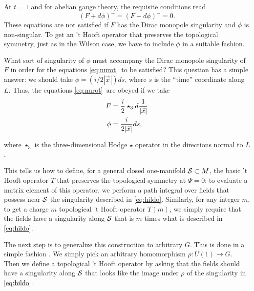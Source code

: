At $t=1$ and for abelian gauge theory, the requisite conditions
read %
\setcounter{equation}{7}
\begin{equation}\label{eq:nurot}
(F+d\phi)^+=(F-d\phi)^-=0.
\end{equation}
 These equations are
not satisfied if $F$ has the Dirac monopole singularity and $\phi$
is non-singular.  To get an 't Hooft operator that preserves the
topological symmetry, just as in the Wilson case, we have to
include $\phi$ in a suitable fashion.

What sort of singularity of $\phi$ must accompany the Dirac
monopole singularity of $F$ in order for the equations \eqref{eq:nurot}\ to
be satisfied? This question has a simple answer: we should take
$\phi=(i/2|\vec x|)ds$, where $s$ is the ``time'' coordinate along
$L$.  Thus, the equations \eqref{eq:nurot}\ are obeyed if we take
\setcounter{equation}{8}
\begin{equation}\label{eq:hildo}
\begin{aligned}F& ={i\over 2}\star_3 d{1\over |\vec x|}\\
                    \phi& = {i\over 2|\vec x|} ds,\\\end{aligned}
\end{equation}

where $\star_3$ is the three-dimensional Hodge $\star$ operator in
the directions normal to $L$.

This tells us how to define, for a general closed one-manifold
${{\cal S}}\subset M$, the basic 't Hooft operator $T$ that
preserves the topological symmetry at $\Psi=0$: to evaluate a
matrix element of this operator, we perform a path integral over
fields that possess near ${{\cal S}}$ the singularity described in
\eqref{eq:hildo}. Similarly, for any integer $m$, to get a charge $m$
topological 't Hooft operator $T(m)$, we simply require that the
fields have a singularity along ${{\cal S}}$ that is $m$ times
what is described in \eqref{eq:hildo}.

\par{}

The next step is to generalize this construction to arbitrary $G$.
This is done in a simple fashion \cite{ref90}.  We
simply pick an arbitrary homomorphism $\rho:U(1)\to G$.   Then we
define a topological 't Hooft operator by asking that the fields
should have a singularity along ${{\cal S}}$ that looks like the
image under $\rho$ of the singularity in \eqref{eq:hildo}.

